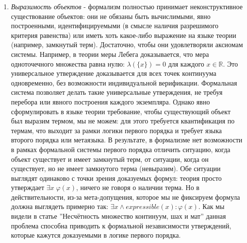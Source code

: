 \documentclass[12pt]{article}
\begin{document}
\begin{enumerate}
    \item {\it Выразимость объектов} - формализм полностью принимает неконструктивное существование объектов: они не обязаны быть вычислимыми, явно построенными, идентифицируемыми (в смысле наличия разрешимого критерия равенства) или иметь хоть какое-либо выражение на языке теории (например, замкнутый терм). Достаточно, чтобы они удовлетворяли аксиомам системы. Например, в теории меры Лебега доказывается, что мера одноточечного множества равна нулю: $\lambda(\{x\}) = 0$ для каждого $x \in \mathbb{R}$. Это универсальное утверждение доказывается для всех точек континуума одновременно, без возможности индивидуальной верификации. Формальная система позволяет делать такие универсальные утверждения, не требуя перебора или явного построения каждого экземпляра. Однако явно сформулировать в языке теории требование, чтобы существующий объект был выразим термом, мы не можем: для этого требуется квантификация по термам, что выходит за рамки логики первого порядка и требует языка второго порядка или метаязыка. В результате, в формализме нет возможности в рамках формальной системы первого порядка отличить ситуацию, когда объект существует и имеет замкнутый терм, от ситуации, когда он существует, но не имеет замкнутого терма (невыразим). Обе ситуации выглядят одинаково с точки зрения доказуемых формул: теория просто утверждает $\exists x \; \varphi(x)$, ничего не говоря о наличии терма. Но в действительности, из-за мета-допущения, которое мы не фиксируем формула должна выглядеть примерно так: $\exists x \wedge expressible(x) : \varphi(x)$. Как мы видели в статье ''Несчётность множество континуум, шах и мат'' данная проблема способна приводить к формальной независимости утверждений, которые кажутся доказуемыми в логике первого порядка.

\end{enumerate}
\end{document}

